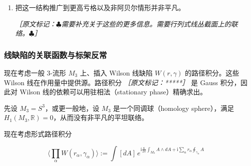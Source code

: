 \begin{enumerate}
  是平行移动的。

  {\small\itshape ［原文标记：****／需要讨论如何下降（descent）到曲线的模叠（moduli stack）以及轨形丛（orbi bundle）；以及为何它是射影平坦联络。／****］}

  \item 把这一结构推广到更高亏格以及非阿贝尔情形并非平凡。

  {\small\itshape ［原文标记：$\clubsuit$需要补充关于这些的更多信息。需要行列式线丛截面上的联络。$\clubsuit$］}
\end{enumerate}

\subsubsection{线缺陷的关联函数与标架反常} %

现在考虑一般 $3$-流形 $M_3$ 上、插入 Wilson 线缺陷 $W(r,\gamma)$ 的路径积分。这些 Wilson 线在作用量中提供源。路径积分 {\small\itshape ［原文标记：*****］} 是 Gauss 积分，因此对 Wilson 线的依赖可以用驻相法（stationary phase）精确求出。

先设 $M_3=S^3$，或更一般地，设 $M_3$ 是一个同调球（homology sphere），满足 $H_1(M_3,\mathbb{R})=0$，从而没有非平凡的平坦联络。

现在考虑形式路径积分

\begin{equation}
  \Big\langle\prod_\alpha W(r_\alpha,\gamma_\alpha)\Big\rangle
  :=\int[dA]\,e^{\mathrm{i}\frac{\kappa}{2\pi}\int_{M_3}A\wedge dA+\mathrm{i}\sum_\alpha r_\alpha\oint_{\gamma_\alpha}A}
  \tag{2.249}
  \label{eq:2.249}
\end{equation}

